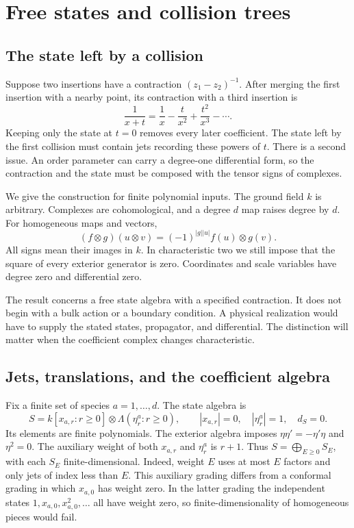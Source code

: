 \section{Free states and collision trees}
\label{sec:free-state-trees}\label{sec:free-states}

\subsection{The state left by a collision}

Suppose two insertions have a contraction \((z_1-z_2)^{-1}\).
After merging the first insertion with a nearby point, its contraction
with a third insertion is
\begin{equation}\label{fs:eq:first-expansion}
 \frac1{x+t}=\frac1x-\frac{t}{x^2}+\frac{t^2}{x^3}-\cdots.
\end{equation}
Keeping only the state at \(t=0\) removes every later coefficient.
The state left by the first collision must contain jets recording
these powers of \(t\).  There is a second issue.  An order parameter
can carry a degree-one differential form, so the contraction and the
state must be composed with the tensor signs of complexes.

We give the construction for finite polynomial inputs.  The ground
field \(k\) is arbitrary.  Complexes are cohomological, and a degree
\(d\) map raises degree by \(d\).  For homogeneous maps and vectors,
\[
 (f\otimes g)(u\otimes v)=(-1)^{|g||u|}f(u)\otimes g(v).
\]
All signs mean their images in \(k\).  In characteristic two we
still impose that the square of every exterior generator is zero.
Coordinates and scale variables have degree zero and differential zero.

The result concerns a free state algebra with a specified contraction.
It does not begin with a bulk action or a boundary condition.
A physical realization would have to supply the stated states,
propagator, and differential.  The distinction will matter when the
coefficient complex changes characteristic.

\subsection{Jets, translations, and the coefficient algebra}

Fix a finite set of species \(a=1,\ldots,d\).  The state algebra is
\begin{equation}\label{fs:eq:state-algebra}
 S=k[x_{a,r}:r\ge0]\otimes\Lambda(\eta^a_r:r\ge0),
 \qquad |x_{a,r}|=0,\quad |\eta^a_r|=1,\quad d_S=0.
\end{equation}
Its elements are finite polynomials.  The exterior algebra imposes
\(\eta\eta'=-\eta'\eta\) and \(\eta^2=0\).
The auxiliary weight of both \(x_{a,r}\) and \(\eta^a_r\) is
\(r+1\).  Thus \(S=\bigoplus_{E\ge0}S_E\), with each \(S_E\)
finite-dimensional.  Indeed, weight \(E\) uses at most \(E\)
factors and only jets of index less than \(E\).
This auxiliary grading differs from a conformal grading in which
\(x_{a,0}\) has weight zero.  In the latter grading the independent
states \(1,x_{a,0},x_{a,0}^2,\ldots\) all have weight zero, so
finite-dimensionality of homogeneous pieces would fail.

